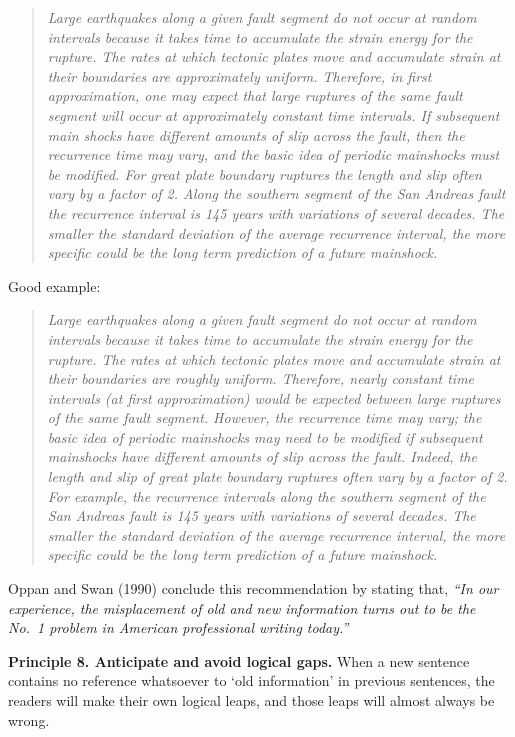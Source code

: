 \documentclass[]{book}
\begin{document}
\begin{quote}
\emph{Large earthquakes along a given fault segment do not occur at random intervals because it takes time to accumulate the strain energy for the rupture. The rates at which tectonic plates move and accumulate strain at their boundaries are approximately uniform. Therefore, in first approximation, one may expect that large ruptures of the same fault segment will occur at approximately constant time intervals. If subsequent main shocks have different amounts of slip across the fault, then the recurrence time may vary, and the basic idea of periodic mainshocks must be modified. For great plate boundary ruptures the length and slip often vary by a factor of 2. Along the southern segment of the San Andreas fault the recurrence interval is 145 years with variations of several decades. The smaller the standard deviation of the average recurrence interval, the more specific could be the long term prediction of a future mainshock.}
\end{quote}

Good example:

\begin{quote}
\emph{Large earthquakes along a given fault segment do not occur at random intervals because it takes time to accumulate the strain energy for the rupture. The rates at which tectonic plates move and accumulate strain at their boundaries are roughly uniform. Therefore, nearly constant time intervals (at first approximation) would be expected between large ruptures of the same fault segment. However, the recurrence time may vary; the basic idea of periodic mainshocks may need to be modified if subsequent mainshocks have different amounts of slip across the fault. Indeed, the length and slip of great plate boundary ruptures often vary by a factor of 2. For example, the recurrence intervals along the southern segment of the San Andreas fault is 145 years with variations of several decades. The smaller the standard deviation of the average recurrence interval, the more specific could be the long term prediction of a future mainshock.}
\end{quote}

Oppan and Swan (1990) conclude this recommendation by stating that, \emph{``In our experience, the misplacement of old and new information turns out to be the No.~1 problem in American professional writing today.''}

\textbf{Principle 8. Anticipate and avoid logical gaps.} When a new sentence contains no reference whatsoever to `old information' in previous sentences, the readers will make their own logical leaps, and those leaps will almost always be wrong.
\end{document}

